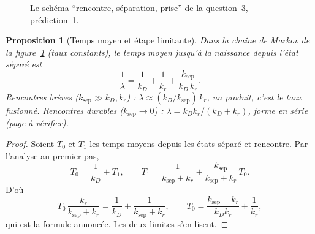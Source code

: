 \documentclass[11pt,a4paper]{article}
\theoremstyle{definition}
\theoremstyle{plain}
\newtheorem{proposition}[definition]{Proposition}
\begin{document}
\begin{figure}[ht]
\centering
{}
\caption{Le schéma \enquote{rencontre, séparation, prise} de la question~3, prédiction~1.}
\label{fig:schema}
\end{figure}

\begin{proposition}[Temps moyen et étape limitante]
\label{prop:tempsmoyen}
Dans la chaîne de Markov de la figure~\ref{fig:schema} (taux constants), le temps moyen jusqu'à la
naissance depuis l'état séparé est
\[ \frac1\lambda=\frac1{k_D}+\frac1{k_r}+\frac{k_{\mathrm{sep}}}{k_D\,k_r}. \]
Rencontres brèves ($k_{\mathrm{sep}}\gg k_D,k_r$) : $\lambda\approx(k_D/k_{\mathrm{sep}})\,k_r$, un
produit, c'est le taux fusionné. Rencontres durables ($k_{\mathrm{sep}}\to0$) :
$\lambda=k_Dk_r/(k_D+k_r)$, forme en série \cite{collins1949} (page à vérifier).
\end{proposition}
\begin{proof}
Soient $T_0$ et $T_1$ les temps moyens depuis les états séparé et rencontre. Par l'analyse au
premier pas,
\[ T_0=\frac1{k_D}+T_1,\qquad T_1=\frac1{k_{\mathrm{sep}}+k_r}+\frac{k_{\mathrm{sep}}}{k_{\mathrm{sep}}+k_r}\,T_0 . \]
D'où
\[ T_0\,\frac{k_r}{k_{\mathrm{sep}}+k_r}=\frac1{k_D}+\frac1{k_{\mathrm{sep}}+k_r},\qquad
   T_0=\frac{k_{\mathrm{sep}}+k_r}{k_Dk_r}+\frac1{k_r}, \]
qui est la formule annoncée. Les deux limites s'en lisent.
\end{proof}
\end{document}
